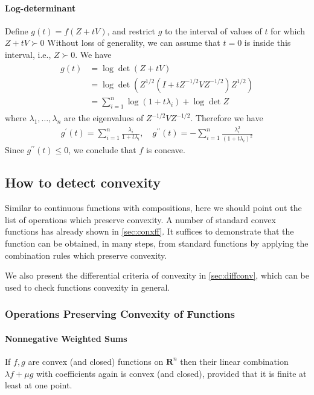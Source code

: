 \documentclass{article}
\newcommand{\dom}{\operatorname{dom}}
\begin{document}
\paragraph{Log-determinant}
\centerline{\tb{$f(X)=\log \operatorname{det} X$ is concave on $\dom  f=$ $\mathbf{S}_{++}^{n}$:}}

Define $g(t)=f(Z+t V)$, and restrict $g$ to the interval of values of $t$ for which $Z+t V \succ 0$ Without loss of generality, we can assume that $t=0$ is inside this interval, i.e., $Z \succ 0 .$ We have
\begin{align*}
\begin{aligned}
g(t) &=\log \operatorname{det}(Z+t V) \\
&=\log \operatorname{det}\left(Z^{1 / 2}\left(I+t Z^{-1 / 2} V Z^{-1 / 2}\right) Z^{1 / 2}\right) \\
&=\sum_{i=1}^{n} \log \left(1+t \lambda_{i}\right)+\log \operatorname{det} Z
\end{aligned}
\end{align*}
where $\lambda_{1}, \ldots, \lambda_{n}$ are the eigenvalues of $Z^{-1 / 2} V Z^{-1 / 2} .$ Therefore we have
\begin{align*}
g^{\prime}(t)=\sum_{i=1}^{n} \frac{\lambda_{i}}{1+t \lambda_{i}}, \quad g^{\prime \prime}(t)=-\sum_{i=1}^{n} \frac{\lambda_{i}^{2}}{\left(1+t \lambda_{i}\right)^{2}}
\end{align*}
Since $g^{\prime \prime}(t) \leq 0$, we conclude that $f$ is concave.

\subsection{How to detect convexity}
Similar to continuous functions with compositions, here we should point out the list of operations which preserve convexity. A number of standard convex functions has already shown in \cref{sec:conxff}. It suffices to demonstrate that the function can be obtained, in  many steps, from standard functions  by applying the combination rules which preserve convexity.

We also present the differential criteria of convexity in \cref{sec:diffconv}, which can be used to check functions convexity in general.

\subsubsection{Operations Preserving Convexity of Functions}\label{sec:oper_conv}
\paragraph{Nonnegative Weighted Sums}
If $f, g$ are convex (and closed) functions on $\mathbf{R}^{n}$ then their linear combination $\lambda f+\mu g$ with  coefficients again is convex (and closed), provided that it is finite at least at one point.
\end{document}
